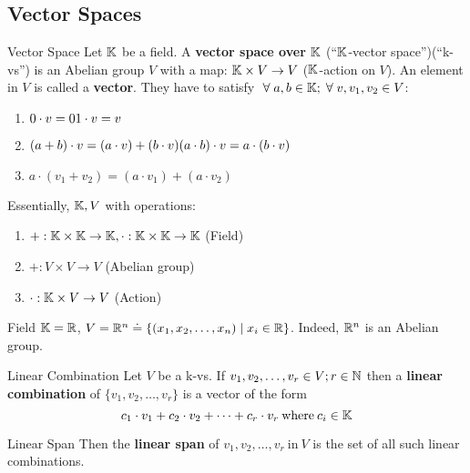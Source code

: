 \subsection{Vector Spaces}
\begin{definition} {Vector Space}
    Let \(\mathbb{K}\) be a field. A \textbf{vector space over \(\mathbb{K}\)} (``\(\mathbb{K}\)-vector space'')(``k-vs'') is an Abelian group \(V\) with a map: \(\mathbb{K} \times V \to V\) (\(\mathbb{K}\)-action on \(V\)). An element in \(V\) is called a \textbf{vector}. They have to satisfy \(\forall a, b \in \bbk; \forall v, v_1, v_2 \in V\):
    \begin{enumerate}
        \item \(0 \cdot v = 0\\ 1 \cdot v = v\)
        \item \((a + b) \cdot v = (a \cdot v) + (b \cdot v)\\ (a \cdot b) \cdot v = a \cdot (b \cdot v)\)
        \item \(a \cdot (v_1 +  v_2) = (a \cdot v_1) + (a \cdot v_2)\)
    \end{enumerate}

    Essentially, \(\mathbb{K}, V\) with operations:
    \begin{enumerate}
        \item \(+: \mathbb{K} \times \mathbb{K} \to \mathbb{K}, \cdot: \mathbb{K} \times \mathbb{K} \to \mathbb{K}\) (Field)
        \item \(+: V \times V \to V\) (Abelian group)
        \item \(\cdot: \mathbb{K} \times V \to V\) (Action)
    \end{enumerate}
\end{definition}

\begin{example}
    Field \(\mathbb{K} = \mathbb{R}\), \(V = \mathbb{R}^n \doteq \{(x_1, x_2, \dots, x_n) \mid x_i \in \mathbb{R}\}\). Indeed, \(\mathbb{R}^n\) is an Abelian group.
\end{example}

\begin{definition} {Linear Combination}
    Let \(V\) be a k-vs. If \(v_1, v_2, \dots, v_r \in V; r \in \mathbb{N}\) then a \textbf{linear combination} of \(\{v_1, v_2, \dots, v_r\}\) is a vector of the form \[
        c_1 \cdot v_1 + c_2 \cdot v_2 + \dots + c_r \cdot v_r \:\text{where}\: c_i \in \mathbb{K}
    \]
\end{definition}

\begin{definition} {Linear Span}
    Then the \textbf{linear span} of \(v_1, v_2, \dots, v_r \:\text{in}\: V\) is the set of all such linear combinations.
\end{definition}

